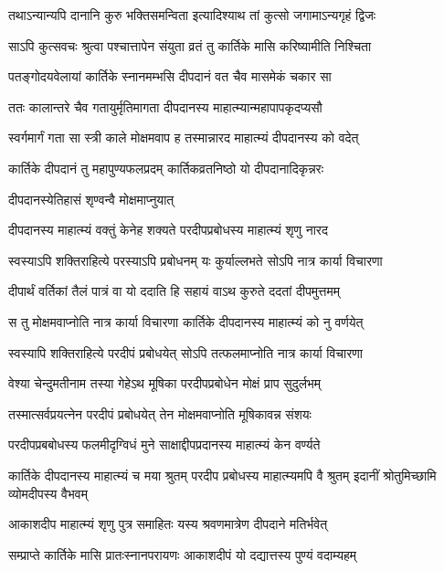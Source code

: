 \twolineshloka
{तथाऽन्यान्यपि दानानि कुरु भक्तिसमन्विता}
{इत्यादिश्याथ तां कुत्सो जगामाऽन्यगृहं द्विजः} %

\twolineshloka
{साऽपि कुत्सवचः श्रुत्वा पश्चात्तापेन संयुता}
{व्रतं तु कार्तिके मासि करिष्यामीति निश्चिता} %

\twolineshloka
{पतङ्गोदयवेलायां कार्तिके स्नानमम्भसि}
{दीपदानं वत चैव मासमेकं चकार सा} %

\twolineshloka
{ततः कालान्तरे चैव गतायुर्मृतिमागता}
{दीपदानस्य माहात्म्यान्महापापकृदप्यसौ} %

\twolineshloka
{स्वर्गमार्गं गता सा स्त्री काले मोक्षमवाप ह}
{तस्मान्नारद माहात्म्यं दीपदानस्य को वदेत्} %

\twolineshloka
{कार्तिके दीपदानं तु महापुण्यफलप्रदम्}
{कार्तिकव्रतनिष्ठो यो दीपदानादिकृन्नरः} %


\onelineshloka
{दीपदानस्येतिहासं शृण्वन्वै मोक्षमाप्नुयात्} %

\twolineshloka
{दीपदानस्य माहात्म्यं वक्तुं केनेह शक्यते}
{परदीपप्रबोधस्य माहात्म्यं शृणु नारद} %

\twolineshloka
{स्वस्याऽपि शक्तिराहित्ये परस्याऽपि प्रबोधनम्}
{यः कुर्याल्लभते सोऽपि नात्र कार्या विचारणा} %

\twolineshloka
{दीपार्थं वर्तिकां तैलं पात्रं वा यो ददाति हि}
{सहायं वाऽथ कुरुते ददतां दीपमुत्तमम्} %

\twolineshloka
{स तु मोक्षमवाप्नोति नात्र कार्या विचारणा}
{कार्तिके दीपदानस्य माहात्म्यं को नु वर्णयेत्} %

\twolineshloka
{स्वस्यापि शक्तिराहित्ये परदीपं प्रबोधयेत्}
{सोऽपि तत्फलमाप्नोति नात्र कार्या विचारणा} %

\twolineshloka
{वेश्या चेन्दुमतीनाम तस्या गेहेऽथ मूषिका}
{परदीपप्रबोधेन मोक्षं प्राप सुदुर्लभम्} %

\twolineshloka
{तस्मात्सर्वप्रयत्नेन परदीपं प्रबोधयेत्}
{तेन मोक्षमवाप्नोति मूषिकावन्न संशयः} %

\twolineshloka
{परदीपप्रबबोधस्य फलमीदृग्विधं मुने}
{साक्षाद्दीपप्रदानस्य माहात्म्यं केन वर्ण्यते} %


\threelineshloka
{कार्तिके दीपदानस्य माहात्म्यं च मया श्रुतम्}
{परदीप प्रबोधस्य माहात्म्यमपि वै श्रुतम्}
{इदानीं श्रोतुमिच्छामि व्योमदीपस्य वैभवम्} %


\twolineshloka
{आकाशदीप माहात्म्यं शृणु पुत्र समाहितः}
{यस्य श्रवणमात्रेण दीपदाने मतिर्भवेत्} %

\twolineshloka
{सम्प्राप्ते कार्तिके मासि प्रातःस्नानपरायणः}
{आकाशदीपं यो दद्यात्तस्य पुण्यं वदाम्यहम्} %

